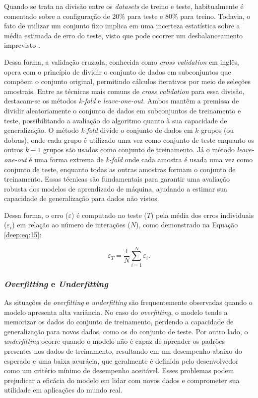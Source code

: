 Quando se trata na divisão entre os \textit{datasets} de treino e teste, habitualmente é comentado sobre a configuração de 20\% para teste e 80\% para treino. Todavia, o fato de utilizar um conjunto fixo implica em uma incerteza estatística sobre a média estimada de erro do teste, visto que pode ocorrer um desbalanceamento imprevisto \citep{Goodfellow2016}.

Dessa forma, a validação cruzada, conhecida como \textit{cross validation} em inglês, opera com o princípio de dividir o conjunto de dados em subconjuntos que compõem o conjunto original, permitindo cálculos iterativos por meio de seleções amostrais. Entre as técnicas mais comuns de \textit{cross validation} para essa divisão, destacam-se os métodos \textit{k-fold} e \textit{leave-one-out}. Ambos mantêm a premissa de dividir aleatoriamente o conjunto de dados em subconjuntos de treinamento e teste, possibilitando a avaliação do algoritmo quanto à sua capacidade de generalização. O método \textit{k-fold} divide o conjunto de dados em $k$ grupos (ou dobras), onde cada grupo é utilizado uma vez como conjunto de teste enquanto os outros $k-1$ grupos são usados como conjunto de treinamento. Já o método \textit{leave-one-out} é uma forma extrema de \textit{k-fold} onde cada amostra é usada uma vez como conjunto de teste, enquanto todas as outras amostras formam o conjunto de treinamento. Essas técnicas são fundamentais para garantir uma avaliação robusta dos modelos de aprendizado de máquina, ajudando a estimar sua capacidade de generalização para dados não vistos.

Dessa forma, o erro ($\varepsilon$) é computado no teste ($T$) pela média dos erros individuais ($\varepsilon_i$) em relação ao número de interações ($N$), como demonstrado na Equação \ref{deep:eq:15}:

\begin{equation}
    \label{deep:eq:15}
    \varepsilon_T = \frac{1}{N} \sum_{i=1}^{N} \varepsilon_i.
\end{equation}


\subsubsection{\textit{Overfitting} e \textit{Underfitting}}
\label{deep:overunder}

As situações de \textit{overfitting} e \textit{underfitting} são frequentemente observadas quando o modelo apresenta alta variância. No caso do \textit{overfitting}, o modelo tende a memorizar os dados do conjunto de treinamento, perdendo a capacidade de generalização para novos dados, como os do conjunto de teste. Por outro lado, o \textit{underfitting} ocorre quando o modelo não é capaz de aprender os padrões presentes nos dados de treinamento, resultando em um desempenho abaixo do esperado e uma baixa acurácia, que geralmente é definida pelo desenvolvedor como um critério mínimo de desempenho aceitável. Esses problemas podem prejudicar a eficácia do modelo em lidar com novos dados e comprometer sua utilidade em aplicações do mundo real.

